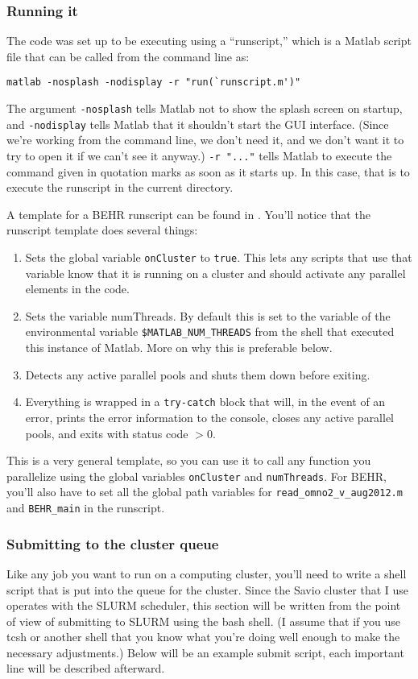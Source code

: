 \documentclass[12pt]{article}
\begin{document}
	\subsubsection{Running it}
		The code was set up to be executing using a ``runscript,'' which is a Matlab script file that can be called from the command line as:
\begin{lstlisting}
matlab -nosplash -nodisplay -r "run(`runscript.m')"
\end{lstlisting}
		The argument \texttt{-nosplash} tells Matlab not to show the splash screen on startup, and \texttt{-nodisplay} tells Matlab that it shouldn't start the GUI interface. (Since we're working from the command line, we don't need it, and we don't want it to try to open it if we can't see it anyway.) \texttt{-r "..."} tells Matlab to execute the command given in quotation marks as soon as it starts up.  In this case, that is to execute the runscript in the current directory.
		
		A template for a BEHR runscript can be found in . You'll notice that the runscript template does several things:
		\begin{enumerate}
			\item Sets the global variable \texttt{onCluster} to \texttt{true}.  This lets any scripts that use that variable know that it is running on a cluster and should activate any parallel elements in the code.
			\item Sets the variable numThreads.  By default this is set to the variable of the environmental variable \texttt{\$MATLAB\_NUM\_THREADS} from the shell that executed this instance of Matlab. More on why this is preferable below.
			\item Detects any active parallel pools and shuts them down before exiting.
			\item Everything is wrapped in a \texttt{try-catch} block that will, in the event of an error, prints the error information to the console, closes any active parallel pools, and exits with status code $> 0$.
		\end{enumerate}

		This is a very general template, so you can use it to call any function you parallelize using the global variables \texttt{onCluster} and \texttt{numThreads}.  For BEHR, you'll also have to set all the global path variables for \texttt{read\_omno2\_v\_aug2012.m} and \texttt{BEHR\_main} in the runscript.
		
	\subsubsection{Submitting to the cluster queue} \label{sec:ClusterQueueMatlab}
		Like any job you want to run on a computing cluster, you'll need to write a shell script that is put into the queue for the cluster.  Since the Savio cluster that I use operates with the SLURM scheduler, this section will be written from the point of view of submitting to SLURM using the bash shell. (I assume that if you use tcsh or another shell that you know what you're doing well enough to make the necessary adjustments.) Below will be an example submit script, each important line will be described afterward.
\end{document}
